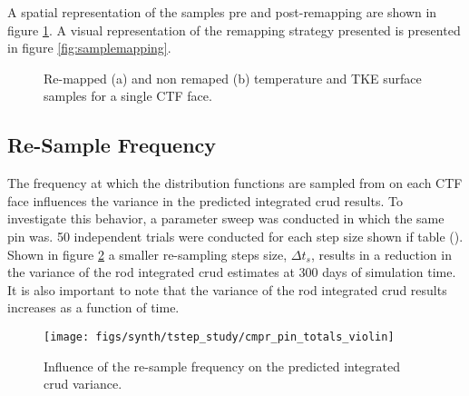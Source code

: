 A spatial representation of the samples pre and post-remapping are shown in figure \ref{fig:remmap_comp}.  A visual representation of the remapping strategy presented is presented in figure \ref{fig:samplemapping}.

\begin{figure}[H]%
    \centering
    \qquad
    \caption[Re-mapped and non remaped temperature and TKE surface samples]{Re-mapped (a) and non remaped (b) temperature and TKE surface samples for a single CTF face.}%
    \label{fig:remmap_comp}%
\end{figure}

\subsection{Re-Sample Frequency}
\label{sec:resample_freq_study}

The frequency at which the distribution functions are sampled from on each CTF face influences the variance in the predicted integrated crud results.  To investigate this behavior, a parameter sweep was conducted in which the same pin was.  50 independent trials were conducted for each step size shown if table ().  Shown in figure \ref{fig:cmprpintotalsviolin} a smaller re-sampling steps size, $\Delta t_s$, results in a reduction in the variance of the rod integrated crud estimates at 300 days of simulation time.  It is also important to note that the variance of the rod integrated crud results increases as a function of time.

\begin{figure}[H]
    \centering
    \texttt{[image: figs/synth/tstep\_study/cmpr\_pin\_totals\_violin]}
    \caption{Influence of the re-sample frequency on the predicted integrated crud variance.}
    \label{fig:cmprpintotalsviolin}
\end{figure}

